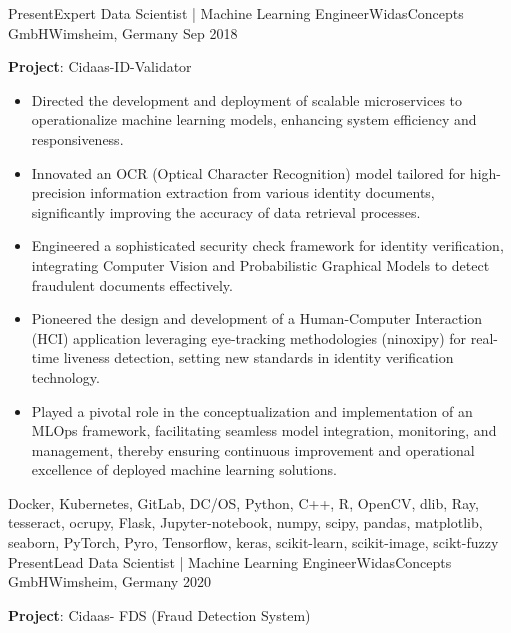 %
%
%
\begin{experiences}
	\experience
	{Present}{Expert Data Scientist | Machine Learning Engineer}{WidasConcepts GmbH}{Wimsheim, Germany}
	{Sep 2018} {
		\vspace{0.1cm}
		\textbf{Project}: Cidaas-ID-Validator
		\begin{itemize}
			\item Directed the development and deployment of scalable microservices to operationalize machine learning models, enhancing system efficiency and responsiveness.
			\item Innovated an OCR (Optical Character Recognition) model tailored for high-precision information extraction from various identity documents, significantly improving the accuracy of data retrieval processes.
			\item Engineered a sophisticated security check framework for identity verification, integrating Computer Vision and Probabilistic Graphical Models to detect fraudulent documents effectively.
			\item Pioneered the design and development of a Human-Computer Interaction (HCI) application leveraging eye-tracking methodologies (ninoxipy) for real-time liveness detection, setting new standards in identity verification technology.
			\item Played a pivotal role in the conceptualization and implementation of an MLOps framework, facilitating seamless model integration, monitoring, and management, thereby ensuring continuous improvement and operational excellence of deployed machine learning solutions.
		\end{itemize}
	}
	{Docker, Kubernetes, GitLab, DC/OS, Python, C++, R,  OpenCV, dlib, Ray, tesseract, ocrupy, Flask, Jupyter-notebook, numpy, scipy, pandas, matplotlib, seaborn, PyTorch, Pyro, Tensorflow, keras, scikit-learn, scikit-image, scikt-fuzzy}
	\emptySeparator
	\experience
	{Present}{Lead Data Scientist | Machine Learning Engineer}{WidasConcepts GmbH}{Wimsheim, Germany}
	{2020} {
		\vspace{0.1cm}
		\textbf{Project}: Cidaas- FDS (Fraud Detection System)
		\begin{itemize}

\end{itemize}}
\end{experiences}
